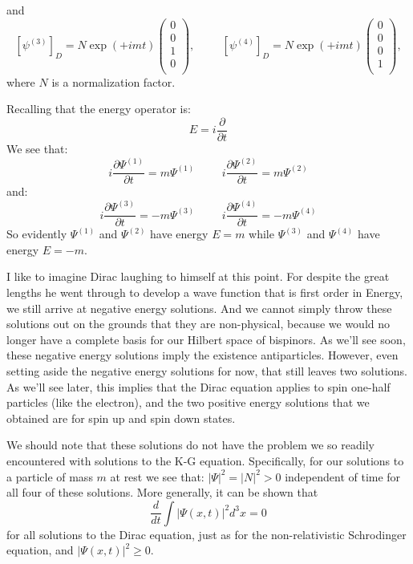 \documentclass[12pt]{article}
\begin{document}
and
$$
[\psi^{(3)}]_D = N \exp\left(+ i m t\right)
\begin{pmatrix}
0\\
0\\
1\\
0\\
\end{pmatrix},
\hspace{1cm}
[\psi^{(4)}]_D = N \exp\left(+ i m t\right)
\begin{pmatrix}
0\\
0\\
0\\
1\\
\end{pmatrix},
$$
where $N$ is a normalization factor.

Recalling that the energy operator is:
$$E = i \frac{\partial}{\partial t}$$
We see that:
$$ i \frac{\partial \Psi^{(1)}}{\partial t} = m \Psi^(1) \hspace{1cm}
i \frac{\partial \Psi^{(2)}}{\partial t} = m \Psi^{(2)}$$
and:
$$ i \frac{\partial \Psi^{(3)}}{\partial t} = -m \Psi^(3) \hspace{1cm}
i \frac{\partial \Psi^{(4)}}{\partial t} = -m \Psi^{(4)}$$
So evidently $\Psi^{(1)}$ and $\Psi^{(2)}$ have energy $E=m$ while $\Psi^{(3)}$
and $\Psi^{(4)}$ have energy $E=-m$.

I like to imagine Dirac laughing to himself at this point.  For
despite the great lengths he went through to develop a wave function
that is first order in Energy, we still arrive at negative energy
solutions.  And we cannot simply throw these solutions out on the
grounds that they are non-physical, because we would no longer have a
complete basis for our Hilbert space of bispinors.  As we'll see soon,
these negative energy solutions imply the existence antiparticles.
However, even setting aside the negative energy solutions for now,
that still leaves two solutions.  As we'll see later, this implies
that the Dirac equation applies to spin one-half particles (like the
electron), and the two positive energy solutions that we obtained are
for spin up and spin down states.

We should note that these solutions do not have the problem we
so readily encountered with solutions to the K-G equation. Specifically, for our solutions to a particle of mass $m$ at rest we see that:
$|\Psi|^2 = |N|^2 > 0$
independent of time for all four of these solutions.  More generally, it can be shown that
$$\frac{d}{dt}\int |\Psi(x,t)|^2 d^3x = 0$$
for all solutions to the Dirac equation, just as for the non-relativistic Schrodinger equation, and
$|\Psi(x,t)|^2 \geq 0$.
\end{document}
